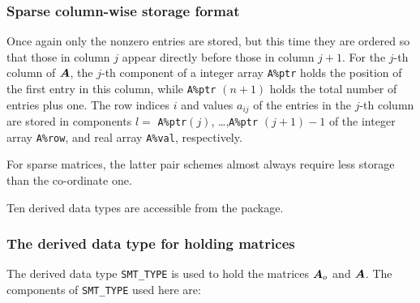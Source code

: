 \documentclass{galahad}
\begin{document}
\subsubsection{Sparse column-wise storage format}\label{columnwise}
Once again only the nonzero entries are stored, but this time
they are ordered so that those in column $j$ appear directly before those
in column $j+1$. For the $j$-th column of ${\bm{A}}$, the $j$-th component of a
integer array {\tt A\%ptr} holds the position of the first entry in this column,
while {\tt A\%ptr} $(n+1)$ holds the total number of entries plus one.
The row indices $i$ and values $a_{ij}$ of the entries in the $j$-th column
are stored in components
$l =$ {\tt A\%ptr}$(j)$, \ldots ,{\tt A\%ptr} $(j+1)-1$ of the
integer array {\tt A\%row}, and real array {\tt A\%val}, respectively.

For sparse matrices, the latter pair schemes almost always require less
storage than the co-ordinate one.








\galtypes
Ten derived data types are accessible from the package.


\subsubsection{The derived data type for holding matrices}\label{typesmt}
The derived data type {\tt SMT\_TYPE} is used to hold the matrices ${\bm{A}}_o$
and ${\bm{A}}$.
The components of {\tt SMT\_TYPE} used here are:
\end{document}
